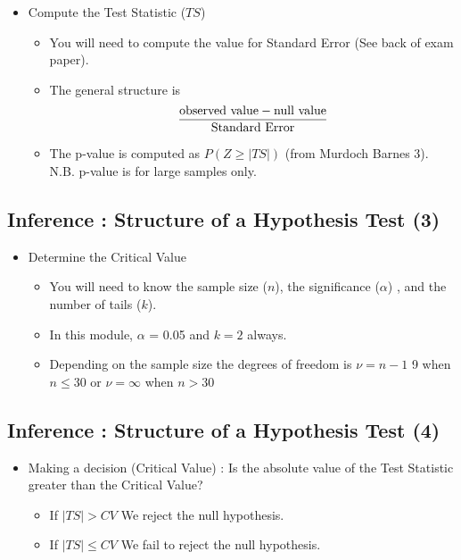 \documentclass[]{report}
\begin{document}
{{\begin{itemize}
\item Compute the Test Statistic ($TS$)
\begin{itemize}
\item You will need to compute the value for Standard Error (See back of exam paper).
\item The general structure is 
\[ {\mbox{observed value} - \mbox{null value} \over \mbox{Standard Error}}  \]
\item The p-value is computed as $P(Z \geq |TS|)$ (from Murdoch Barnes 3). \\N.B. p-value is for large samples only.
\end{itemize}
\end{itemize}





\subsection{Inference : Structure of a Hypothesis Test (3) }


\begin{itemize}
\item Determine the Critical Value
\begin{itemize}
\item You will need to know the sample size ($n$), the significance ($\alpha$) , and the number of tails ($k$).
\item In this module, $\alpha$ = 0.05 and $k=2$ always.
\item Depending on the sample size the degrees of freedom is $\nu = n-1$ 9 when $n \leq 30$ or $\nu = \infty$ when $n > 30$
\end{itemize}
\end{itemize}



{
\subsection{Inference : Structure of a Hypothesis Test (4) }

\begin{itemize}
\item Making a decision (Critical Value) :  Is the absolute value of the Test Statistic greater than the Critical Value?
\begin{itemize}
\item If $|TS| > CV $ We reject the null hypothesis.
\item If $|TS| \leq CV $ We fail to reject the null hypothesis.
\end{itemize}
\end{itemize}
}

}}
\end{document}
